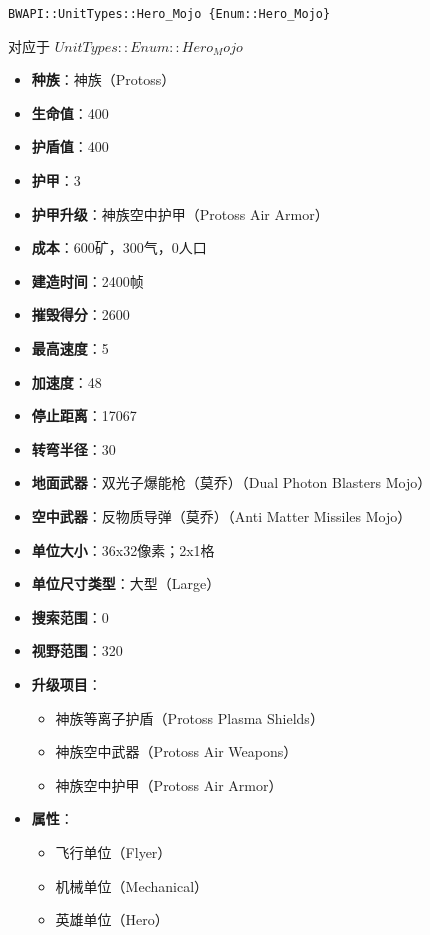 \begin{tcolorbox}[colback=white, colframe=black!60!white, title=Hero\_Mojo(), arc=0mm]
    \begin{verbatim}
BWAPI::UnitTypes::Hero_Mojo {Enum::Hero_Mojo}
    \end{verbatim}
    对应于  $ UnitTypes::Enum::Hero_Mojo $ 
    \begin{itemize}
        \item \textbf{种族}：神族（Protoss）
        \item \textbf{生命值}：400
        \item \textbf{护盾值}：400
        \item \textbf{护甲}：3
        \item \textbf{护甲升级}：神族空中护甲（Protoss Air Armor）
        \item \textbf{成本}：600矿，300气，0人口
        \item \textbf{建造时间}：2400帧
        \item \textbf{摧毁得分}：2600
        \item \textbf{最高速度}：5
        \item \textbf{加速度}：48
        \item \textbf{停止距离}：17067
        \item \textbf{转弯半径}：30
        \item \textbf{地面武器}：双光子爆能枪（莫乔）（Dual Photon Blasters Mojo）
        \item \textbf{空中武器}：反物质导弹（莫乔）（Anti Matter Missiles Mojo）
        \item \textbf{单位大小}：36x32像素；2x1格
        \item \textbf{单位尺寸类型}：大型（Large）
        \item \textbf{搜索范围}：0
        \item \textbf{视野范围}：320
        \item \textbf{升级项目}：
            \begin{itemize}
                \item 神族等离子护盾（Protoss Plasma Shields）
                \item 神族空中武器（Protoss Air Weapons）
                \item 神族空中护甲（Protoss Air Armor）
            \end{itemize}
        \item \textbf{属性}：
            \begin{itemize}
                \item 飞行单位（Flyer）
                \item 机械单位（Mechanical）
                \item 英雄单位（Hero）
            \end{itemize}
    \end{itemize}
\end{tcolorbox}

